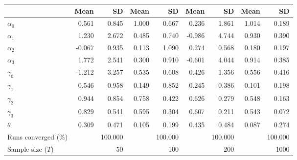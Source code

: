
\begin{tabular}[t]{lrrrrrrrr}
\toprule
  & Mean & SD & Mean  & SD  & Mean   & SD   & Mean    & SD   \\
\midrule
$\alpha_{0}$ & 0.561 & 0.845 & 1.000 & 0.667 & 0.236 & 1.861 & 1.014 & 0.189\\
$\alpha_{1}$ & 1.230 & 2.672 & 0.485 & 0.740 & -0.986 & 4.744 & 0.930 & 0.390\\
$\alpha_{2}$ & -0.067 & 0.935 & 0.113 & 1.090 & 0.274 & 0.568 & 0.180 & 0.197\\
$\alpha_{3}$ & 1.772 & 2.541 & 0.300 & 0.910 & -0.601 & 4.044 & 0.914 & 0.385\\
$\gamma_{0}$ & -1.212 & 3.257 & 0.535 & 0.608 & 0.426 & 1.356 & 0.556 & 0.416\\
$\gamma_{1}$ & 0.546 & 0.958 & 0.149 & 0.852 & 0.245 & 0.386 & 0.101 & 0.198\\
$\gamma_{2}$ & 0.944 & 0.854 & 0.758 & 0.422 & 0.626 & 0.279 & 0.548 & 0.163\\
$\gamma_{3}$ & 0.829 & 0.541 & 0.595 & 0.304 & 0.607 & 0.211 & 0.543 & 0.072\\
$\theta$ & 0.309 & 0.471 & 0.105 & 0.199 & 0.435 & 0.484 & 0.087 & 0.274\\
Runs converged (\%) &  & 100.000 &  & 100.000 &  & 100.000 &  & 100.000\\
Sample size ($T$) &  & 50 &  & 100 &  & 200 &  & 1000\\
\bottomrule
\end{tabular}
